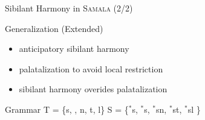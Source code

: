 \documentclass[xcolor={usenames,svgnames,x11names,table}]{beamer}
\begin{document}
 
 \begin{frame}{Sibilant Harmony in \textsc{Samala} (2/2) }
         
         \begin{block}{Generalization (Extended)}
         	\begin{itemize}
         		\item anticipatory sibilant harmony
        			\item palatalization to avoid local restriction %
       			 \item sibilant harmony overides palatalization
         	\end{itemize}
         \end{block}
         
         \begin{exampleblock}{Grammar}
        T = \{s, , n, t, l\} 
        S = \{$^*$s, $^*$s, $^*$sn,  $^*$st,  $^*$sl \}
        \end{exampleblock}
        

\end{frame}
\end{document}
